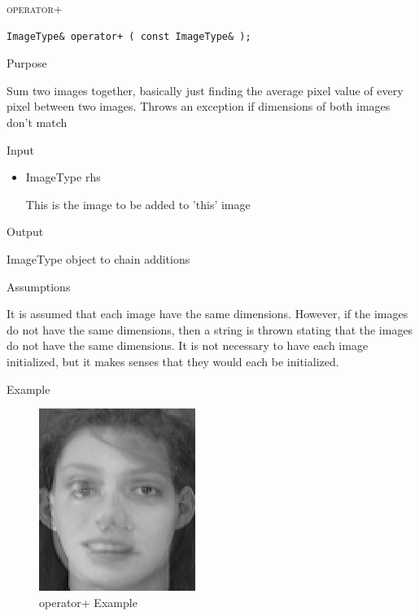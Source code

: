 \documentclass[pdftex, 11pt]{article}
\begin{document}
\begin{description}
\begin{description}
		\end{description}


	\item{\textsc{operator+}}
		\begin{description}

\begin{lstlisting}
ImageType& operator+ ( const ImageType& );
\end{lstlisting}

			\item{Purpose}

				
				Sum two images together, basically just finding
				the average pixel value of
				every pixel between two images.  Throws an
				exception if dimensions of both
				images don't match

			\item{Input}

				\begin{itemize}
						
					\item{ImageType rhs}

						This is the image to be added to
						'this' image

				\end{itemize}

			\item{Output}

				ImageType object to chain additions

			\item{Assumptions}

				It is assumed that each image have the same dimensions.
				However, if the images do not have the same dimensions,
				then a string is thrown stating that the images do
				not have the same dimensions. It is not necessary to have
				each image initialized, but it makes senses
				that they would each be initialized.

			\item{Example}

				\begin{figure}[ht!]
					\centering
					\caption{operator+ Example}
				\includegraphics{images/outasum.png}
			\end{figure}



\end{description}
\end{description}
\end{document}
